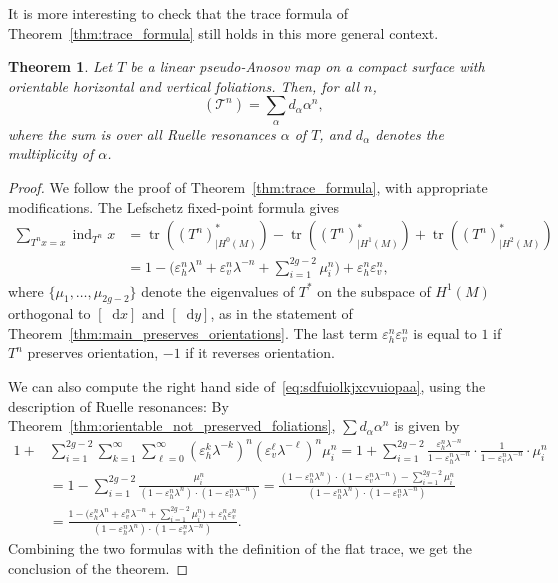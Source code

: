 \documentclass[JEP,XML,SOM,Unicode]{cedram}
\newcommand{\boT}{\mathcal{T}}
\newcommand{\dd}{\mathop{}\!\mathrm{d}}
\newcommand{\pareg}[1]{\bigl(#1\bigr)}
\newcommand{\paregg}[1]{\biggl(#1\biggr)}
\newcommand{\restr}{|}
\DeclareMathOperator{\ind}{ind}
\DeclareMathOperator{\flattr}{\mathrm{tr}^{\flat}}
\DeclareMathOperator{\tr}{tr}
\let\epsilon\varepsilon
\newtheorem{thm}{Theorem}[section]
\theoremstyle{definition}
\numberwithin{equation}{section}
\begin{document}
It is more interesting to check that the trace formula of
Theorem~\ref{thm:trace_formula} still holds in this more general context.
\begin{thm}
\label{thm:trace_orientable} Let $T$ be a linear pseudo-Anosov map on a
compact surface with orientable horizontal and vertical foliations. Then, for
all $n$,
\begin{equation}
\label{eq:sdfuiolkjxcvuiopaa}
\flattr(\boT^n) = \sum_\alpha d_\alpha \alpha^n,
\end{equation}
where the sum is over all Ruelle resonances $\alpha$ of $T$, and $d_\alpha$
denotes the multiplicity of $\alpha$.
\end{thm}
\begin{proof}
We follow the proof of Theorem~\ref{thm:trace_formula}, with appropriate
modifications. The Lefschetz fixed-point formula gives
\begin{align*}
\sum_{T^n x = x} \ind_{T^n} x
&= \tr((T^n)_{\restr H^0(M)}^*) - \tr((T^n)_{\restr H^1(M)}^*) + \tr((T^n)_{\restr H^2(M)}^*)
\\[-5pt]
& = 1 - \paregg{\epsilon_h^n\lambda^n + \epsilon_v^n \lambda^{-n} + \sum_{i=1}^{2g-2} \mu_i^n} + \epsilon_h^n \epsilon_v^n,
\end{align*}
where $\{\mu_1,\dotsc, \mu_{2g-2}\}$ denote the eigenvalues of $T^*$ on the
subspace of $H^1(M)$ orthogonal to $[\dd x]$ and $[\dd y]$, as in the
statement of Theorem~\ref{thm:main_preserves_orientations}. The last term
$\epsilon_h^n \epsilon_v^n$ is equal to $1$ if $T^n$ preserves orientation,
$-1$ if it reverses orientation.

We can also compute the right hand side of~\eqref{eq:sdfuiolkjxcvuiopaa},
using the description of Ruelle resonances: By
Theorem~\ref{thm:orientable_not_preserved_foliations}, $\sum d_\alpha
\alpha^n$ is given by
\begin{align*}
 1 + &\sum_{i=1}^{2g-2} \sum_{k=1}^\infty \sum_{\ell=0}^\infty
(\epsilon_h^k \lambda^{-k})^n (\epsilon_v^\ell \lambda^{-\ell})^n \mu_i^n
= 1 + \sum_{i=1}^{2g-2} \frac{ \epsilon_h^n \lambda^{-n}}{1-\epsilon_h^n \lambda^{-n}} \cdot \frac{1}{1-\epsilon_v^n \lambda^{-n}} \cdot \mu_i^n
\\&
= 1 - \sum_{i=1}^{2g-2} \frac{\mu_i^n}{(1-\epsilon_h^n \lambda^n) \cdot (1-\epsilon_v^n \lambda^{-n})}
= \frac{(1-\epsilon_h^n \lambda^n) \cdot (1-\epsilon_v^n \lambda^{-n}) - \sum_{i=1}^{2g-2} \mu_i^n}{(1-\epsilon_h^n \lambda^n) \cdot (1-\epsilon_v^n
\lambda^{-n})}
\\&
= \frac{1 - \pareg{\epsilon_h^n \lambda^n + \epsilon_v^n \lambda^{-n} + \sum_{i=1}^{2g-2} \mu_i^n} + \epsilon_h^n \epsilon_v^n} {(1-\epsilon_h^n \lambda^n) \cdot
(1-\epsilon_v^n \lambda^{-n})}.
\end{align*}
Combining the two formulas with the definition of the flat trace, we get the
conclusion of the theorem.
\end{proof}
\end{document}
